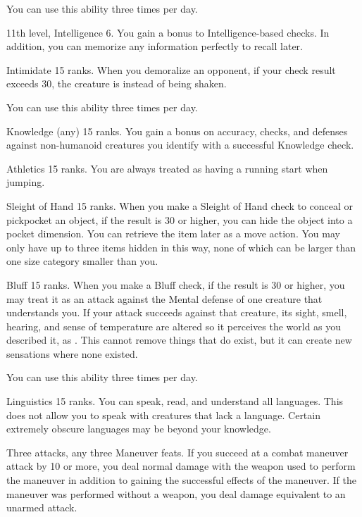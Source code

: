 You can use this ability three times per day.

\featpres 11th level, Intelligence 6.
\featben You gain a  bonus to Intelligence-based checks.
In addition, you can memorize any information perfectly to recall later.

\featpre Intimidate 15 ranks.
\featben When you demoralize an opponent, if your check result exceeds 30, the creature is \panicked instead of being shaken.

You can use this ability three times per day.

\featpre Knowledge (any) 15 ranks.
\featben You gain a  bonus on accuracy, checks, and defenses against non-humanoid creatures you identify with a successful Knowledge check.

\featpre Athletics 15 ranks.
\featben You are always treated as having a running start when jumping.

\featpre Sleight of Hand 15 ranks.
\featben When you make a Sleight of Hand check to conceal or pickpocket an object, if the result is 30 or higher, you can hide the object into a pocket dimension.
You can retrieve the item later as a move action.
You may only have up to three items hidden in this way, none of which can be larger than one size category smaller than you.

\featpre Bluff 15 ranks.
\featben When you make a Bluff check, if the result is 30 or higher, you may treat it as an attack against the Mental defense of one creature that understands you.
If your attack succeeds against that creature, its sight, smell, hearing, and sense of temperature are altered so it perceives the world as you described it, as .
This cannot remove things that do exist, but it can create new sensations where none existed.

You can use this ability three times per day.

\featpre Linguistics 15 ranks.
\featben You can speak, read, and understand all languages.
This does not allow you to speak with creatures that lack a language.
Certain extremely obscure languages may be beyond your knowledge.

\featpres Three attacks, any three Maneuver feats.
\featben If you succeed at a combat maneuver attack by 10 or more, you deal normal damage with the weapon used to perform the maneuver in addition to gaining the successful effects of the maneuver.
If the maneuver was performed without a weapon, you deal damage equivalent to an unarmed attack.

